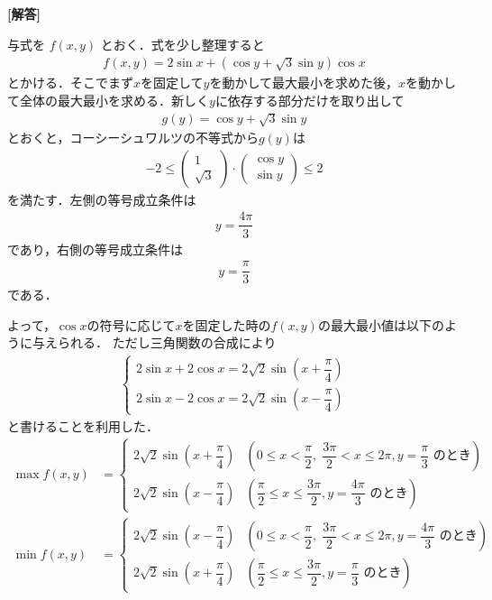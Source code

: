 \documentclass[../../main.tex]{subfiles}
\begin{document}
\begin{oframed}
  
\end{oframed}

{\bf [解答]}

与式を $f(x,y)$ とおく．式を少し整理すると
\begin{align}
  f(x,y) = 2\sin x + \left(\cos y + \sqrt{3}\sin y\right)\cos x
\end{align}
とかける．そこでまず$x$を固定して$y$を動かして最大最小を求めた後，$x$を動かして全体の最大最小を求める．新しく$y$に依存する部分だけを取り出して
\begin{align}
  g(y) = \cos y + \sqrt{3}\sin y
\end{align}
とおくと，コーシーシュワルツの不等式から$g(y)$は
\begin{align}
  -2 \le
  \begin{pmatrix} 1 \\ \sqrt{3}
  \end{pmatrix} \cdot
  \begin{pmatrix} \cos y \\ \sin y
  \end{pmatrix} \le 2
\end{align}
を満たす．左側の等号成立条件は
\begin{align}
  y = \dfrac{4\pi}{3} \label{eq:1}
\end{align}
であり，右側の等号成立条件は
\begin{align}
  y = \dfrac{\pi}{3} \label{eq:2}
\end{align}
である．

よって，$\cos x$の符号に応じて$x$を固定した時の$f(x,y)$の最大最小値は以下のように与えられる．
ただし三角関数の合成により
\begin{align}
  \begin{cases}
    2\sin x + 2 \cos x = 2\sqrt{2}\sin\left(x+\dfrac{\pi}{4}\right)\\
    2\sin x - 2 \cos x = 2\sqrt{2}\sin\left(x-\dfrac{\pi}{4}\right)
  \end{cases}
\end{align}
と書けることを利用した．
\begin{align}
  \max f(x,y) &=
  \begin{cases}
    2\sqrt{2}\sin\left(x+\dfrac{\pi}{4}\right) & \left(0 \le x < \dfrac{\pi}{2}, \; \dfrac{3\pi}{2} < x \le 2\pi, y=\dfrac{\pi}{3} \text{ のとき}\right) \\[8pt]
    2\sqrt{2}\sin\left(x-\dfrac{\pi}{4}\right) & \left(\dfrac{\pi}{2} \le x \le \dfrac{3\pi}{2}, y=\dfrac{4\pi}{3} \text{ のとき}\right)
  \end{cases} \\[10pt]
  \min f(x,y) &=
  \begin{cases}
    2\sqrt{2}\sin\left(x-\dfrac{\pi}{4}\right) & \left(0 \le x < \dfrac{\pi}{2}, \; \dfrac{3\pi}{2} < x \le 2\pi, y=\dfrac{4\pi}{3} \text{ のとき}\right) \\[8pt]
    2\sqrt{2}\sin\left(x+\dfrac{\pi}{4}\right) & \left(\dfrac{\pi}{2} \le x \le \dfrac{3\pi}{2}, y=\dfrac{\pi}{3} \text{ のとき}\right)
  \end{cases}
\end{align}
\end{document}
